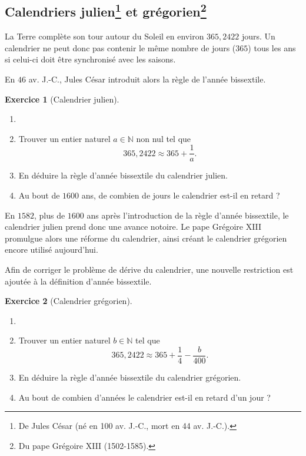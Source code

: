 \documentclass[a4paper, 14pt]{extarticle}
\theoremstyle{plain}
\theoremstyle{definition}
\newtheorem{ex}{Exercice}
\newcommand{\N}{\mathbb{N}}
\begin{document}
\pagestyle{fancy}
\fancyhead[R]{\today}



\subsection*{Calendriers julien\footnote{De Jules César (né en 100 av. J.-C., mort en 44 av. J.-C.).} et grégorien\footnote{Du pape Grégoire XIII (1502-1585).}}

La Terre complète son tour autour du Soleil en environ $365{,}2422$ jours. 
Un calendrier ne peut donc pas contenir le même nombre de jours ($365$) tous les ans si celui-ci doit être synchronisé avec les saisons.

En $46$ av. J.-C., Jules César introduit alors la règle de l'année bissextile.

\begin{ex}[Calendrier julien]
	\begin{enumerate}
		\item[]
		\item
		Trouver un entier naturel $a \in \N$ non nul tel que
			\[ 365{,}2422 \approx 365 + \dfrac1a.\]

		\item
		En déduire la règle d'année bissextile du calendrier julien.
		
		\item Au bout de $1600$ ans, de combien de jours le calendrier est-il en retard ?
	\end{enumerate}
\end{ex}

En $1582$, plus de $1600$ ans après l'introduction de la règle d'année bissextile, le calendrier julien prend donc une avance notoire.
Le pape Grégoire XIII promulgue alors une réforme du calendrier, ainsi créant le calendrier grégorien encore utilisé aujourd'hui.

Afin de corriger le problème de dérive du calendrier, une nouvelle restriction est ajoutée à la définition d'année bissextile.

\begin{ex}[Calendrier grégorien]
	\begin{enumerate}
		\item[]
		\item
		Trouver un entier naturel $b \in \N$ tel que
			\[ 365{,}2422 \approx 365 + \dfrac14 - \dfrac{b}{400}.\]

		\item  En déduire la règle d'année bissextile du calendrier grégorien.
		
		\item Au bout de combien d'années le calendrier est-il en retard d'un jour ?
	\end{enumerate}
\end{ex}
\end{document}
